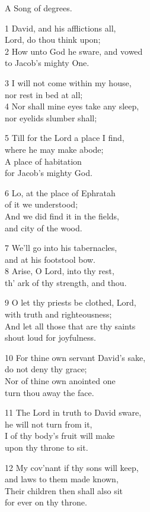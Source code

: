 A Song of degrees.

1 David, and his afflictions all,\\
Lord, do thou think upon;\\
2 How unto God he sware, and vowed\\
to Jacob’s mighty One.

3 I will not come within my house,\\
nor rest in bed at all;\\
4 Nor shall mine eyes take any sleep,\\
nor eyelids slumber shall;

5 Till for the Lord a place I find,\\
where he may make abode;\\
A place of habitation\\
for Jacob’s mighty God.

6 Lo, at the place of Ephratah\\
of it we understood;\\
And we did find it in the fields,\\
and city of the wood.

7 We’ll go into his tabernacles,\\
and at his footstool bow.\\
8 Arise, O Lord, into thy rest,\\
th’ ark of thy strength, and thou.

9 O let thy priests be clothed, Lord,\\
with truth and righteousness;\\
And let all those that are thy saints\\
shout loud for joyfulness.

10 For thine own servant David’s sake,\\
do not deny thy grace;\\
Nor of thine own anointed one\\
turn thou away the face.

11 The Lord in truth to David sware,\\
he will not turn from it,\\
I of thy body’s fruit will make\\
upon thy throne to sit.

12 My cov’nant if thy sons will keep,\\
and laws to them made known,\\
Their children then shall also sit\\
for ever on thy throne.

